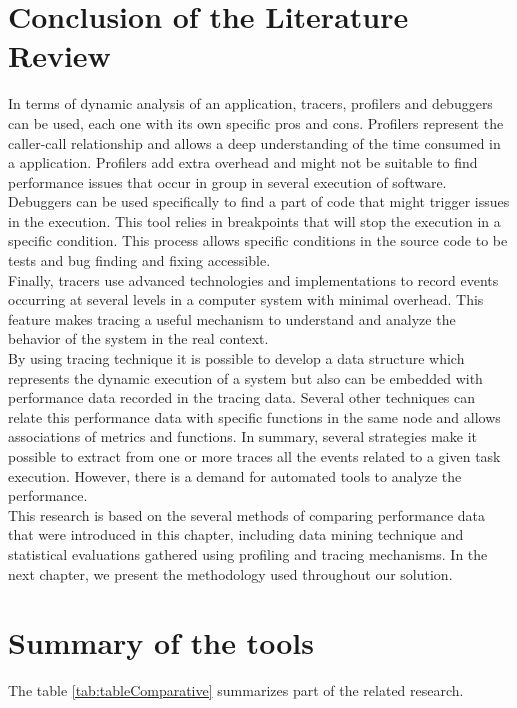 \section{Conclusion of the Literature Review }
In terms of dynamic analysis of an application, tracers, profilers and debuggers can be used, each one with its own specific pros and cons.
Profilers represent the caller-call relationship and allows a deep understanding of the time consumed in a application. Profilers add extra overhead and might not be suitable to find performance issues that occur in group in several execution of software.\\
Debuggers can be used specifically to find a part of code that might trigger issues in the execution. This tool relies in breakpoints that will stop the execution in a specific condition. This process allows specific conditions in the source code to be tests and bug finding and fixing accessible. \\
Finally, tracers use advanced technologies and implementations to record events occurring at several levels in a computer system with minimal overhead. This feature makes tracing a useful mechanism to understand and analyze the behavior of the system in the real context.\\
By using tracing technique it is possible to develop a data structure which represents the dynamic execution of a system but also can be embedded with performance data recorded in the tracing data. Several other techniques can relate this performance data with specific functions in the same node and allows associations of metrics and functions.
In summary, several strategies make it possible to extract from one or more traces all the events related to a given task execution. However, there is a demand for automated tools to analyze the performance.  \\
This research is based on the several methods of comparing performance data that were introduced in this chapter, including data mining technique and statistical evaluations gathered using profiling and tracing mechanisms. In the next chapter, we present the methodology used throughout our solution.\\

\section{Summary of the tools}
The table \ref{tab:tableComparative} summarizes part of the related research.\\

